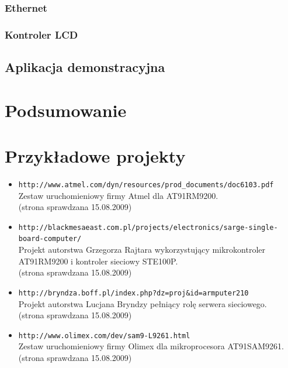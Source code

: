 \documentclass[a4paper,12pt]{book}
\begin{document}
			\subsection{Ethernet}
			\subsection{Kontroler LCD}
		\section{Aplikacja demonstracyjna}
		
	\chapter{Podsumowanie}

	
	
	
	\appendix
	\chapter{Przykładowe projekty}
	\label{app:przykladowe_projekty}
	\begin{itemize}
		\item \texttt{http://www.atmel.com/dyn/resources/prod\_documents/doc6103.pdf}\\
			Zestaw uruchomieniowy firmy Atmel dla AT91RM9200.\\
			\scriptsize{(strona sprawdzana 15.08.2009)}
			\normalsize
		\item \texttt{http://blackmesaeast.com.pl/projects/electronics/sarge-single-\\board-computer/}\\
			Projekt autorstwa Grzegorza Rajtara wykorzystujący mikrokontroler AT91RM9200 i kontroler sieciowy STE100P.\\
			\scriptsize{(strona sprawdzana 15.08.2009)}
			\normalsize
		\item \texttt{http://bryndza.boff.pl/index.php?dz=proj\&id=armputer210}\\
			Projekt autorstwa Lucjana Bryndzy pełniący rolę serwera sieciowego.\\
			\scriptsize{(strona sprawdzana 15.08.2009)}
			\normalsize
		\item \texttt{http://www.olimex.com/dev/sam9-L9261.html}\\
			Zestaw uruchomieniowy firmy Olimex dla mikroprocesora AT91SAM9261.\\
			\scriptsize{(strona sprawdzana 15.08.2009)}
			\normalsize
	\end{itemize}
	
\end{document}
